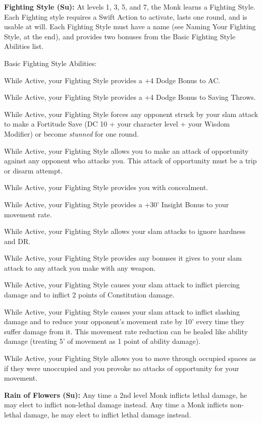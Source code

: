 \textbf{Fighting Style (Su):} At levels 1, 3, 5, and 7, the Monk learns a Fighting Style. Each Fighting style requires a Swift Action to activate, lasts one round, and is usable at will. Each Fighting Style must have a name (see Naming Your Fighting Style, at the end), and provides two bonuses from the Basic Fighting Style Abilities list.

Basic Fighting Style Abilities:
\begin{itemize*}
\item While Active, your Fighting Style provides a +4 Dodge Bonus to AC.
\item While Active, your Fighting Style provides a +4 Dodge Bonus to Saving Throws.
\item While Active, your Fighting Style forces any opponent struck by your slam attack to make a Fortitude Save (DC 10 +  your character level + your Wisdom Modifier) or become \textit{stunned} for one round.
\item While Active, your Fighting Style allows you to make an attack of opportunity against any opponent who attacks you. This attack of opportunity must be a trip or disarm attempt.
\item While Active, your Fighting Style provides you with concealment.
\item While Active, your Fighting Style provides a +30' Insight Bonus to your movement rate.
\item While Active, your Fighting Style allows your slam attacks to ignore hardness and DR.
\item While Active, your Fighting Style provides any bonuses it gives to your slam attack to any attack you make with any weapon.
\item While Active, your Fighting Style causes your slam attack to inflict piercing damage and to inflict 2 points of Constitution damage.
\item While Active, your Fighting Style causes your slam attack to inflict slashing damage and to reduce your opponent's movement rate by 10' every time they suffer damage from it. This movement rate reduction can be healed like ability damage (treating 5' of movement as 1 point of ability damage).
\item While Active, your Fighting Style allows you to move through occupied spaces as if they were unoccupied and you provoke no attacks of opportunity for your movement.
\end{itemize*}

\textbf{Rain of Flowers (Su):} Any time a 2nd level Monk inflicts lethal damage, he may elect to inflict non-lethal damage instead. Any time a Monk inflicts non-lethal damage, he may elect to inflict lethal damage instead.

